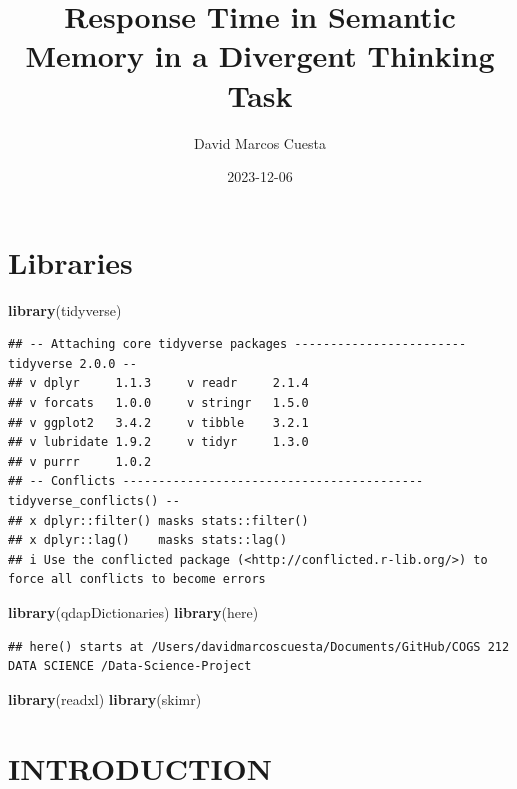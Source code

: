 \documentclass[
]{article}
\title{Response Time in Semantic Memory in a Divergent Thinking Task}
\author{David Marcos Cuesta}
\date{2023-12-06}
\newenvironment{Shaded}{\begin{snugshade}}{\end{snugshade}}
\newcommand{\FunctionTok}[1]{\textcolor[rgb]{0.13,0.29,0.53}{\textbf{#1}}}
\newcommand{\NormalTok}[1]{#1}
\begin{document}
\maketitle

\hypertarget{libraries}{%
\section{Libraries}\label{libraries}}

\begin{Shaded}
\begin{Highlighting}[]
\FunctionTok{library}\NormalTok{(tidyverse)}
\end{Highlighting}
\end{Shaded}

\begin{verbatim}
## -- Attaching core tidyverse packages ------------------------ tidyverse 2.0.0 --
## v dplyr     1.1.3     v readr     2.1.4
## v forcats   1.0.0     v stringr   1.5.0
## v ggplot2   3.4.2     v tibble    3.2.1
## v lubridate 1.9.2     v tidyr     1.3.0
## v purrr     1.0.2     
## -- Conflicts ------------------------------------------ tidyverse_conflicts() --
## x dplyr::filter() masks stats::filter()
## x dplyr::lag()    masks stats::lag()
## i Use the conflicted package (<http://conflicted.r-lib.org/>) to force all conflicts to become errors
\end{verbatim}

\begin{Shaded}
\begin{Highlighting}[]
\FunctionTok{library}\NormalTok{(qdapDictionaries)}
\FunctionTok{library}\NormalTok{(here)}
\end{Highlighting}
\end{Shaded}

\begin{verbatim}
## here() starts at /Users/davidmarcoscuesta/Documents/GitHub/COGS 212 DATA SCIENCE /Data-Science-Project
\end{verbatim}

\begin{Shaded}
\begin{Highlighting}[]
\FunctionTok{library}\NormalTok{(readxl)}
\FunctionTok{library}\NormalTok{(skimr)}
\end{Highlighting}
\end{Shaded}

\hypertarget{introduction}{%
\section{INTRODUCTION}\label{introduction}}
\end{document}
